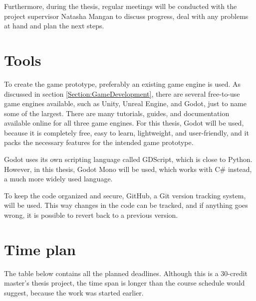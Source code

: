 Furthermore, during the thesis, regular meetings will be conducted with the project supervisor Natasha Mangan to discuss progress, deal with any problems at hand and plan the next steps.



\section{Tools}

To create the game prototype, preferably an existing game engine is used. As discussed in section \ref{Section:GameDevelopment}, there are several free-to-use game engines available, such as Unity, Unreal Engine, and Godot, just to name some of the largest. There are many tutorials, guides, and documentation available online for all three game engines. For this thesis, Godot will be used, because it is completely free, easy to learn, lightweight, and user-friendly, and it packs the necessary features for the intended game prototype.

Godot uses its own scripting language called GDScript, which is close to Python. However, in this thesis, Godot Mono will be used, which works with C\# instead, a much more widely used language.

To keep the code organized and secure, GitHub, a Git version tracking system, will be used. This way changes in the code can be tracked, and if anything goes wrong, it is possible to revert back to a previous version.



\section{Time plan}

The table below contains all the planned deadlines. Although this is a 30-credit master's thesis project, the time span is longer than the course schedule would suggest, because the work was started earlier.

